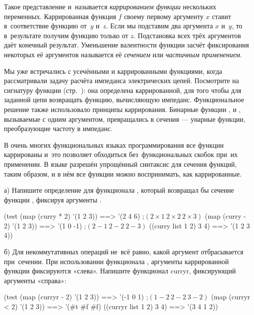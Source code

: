 Такое представление и~называется \emph{каррированием функции} нескольких переменных. Каррированная функция $f$ своему первому аргументу $x$ ставит в~соответствие функцию от~$y$ и~$z$. Если мы подставим два аргумента $x$ и~$y$, то в~результате получим функцию только от $z$. Подстановка всех трёх аргументов даёт конечный результат. Уменьшение валентности функции засчёт фиксирования некоторых её аргументов называется её \emph{сечением} или \emph{частичным применением}.

Мы уже встречались с усечёнными и каррированными функциями, когда рассматривали задачу расчёта импеданса электрических цепей. Посмотрите на сигнатуру функции  (стр.~\pageref{example:impedance}): она определена каррированной, для того чтобы для заданной цепи возвращать функцию, вычисляющую импеданс. Функциональное решение также использовало принципы каррирования. Бинарные функции ,  и , вызываемые с одним аргументом, превращались в сечения --- унарные функции, преобразующие частоту в импеданс.

\label{ML-notation}В очень многих функциональных языках программирования все функции каррированы и~это позволяет обходиться без~функциональных скобок при~их применении. В языке \Scheme разрешён упрощённый синтаксис для сечения функций, таким образом, и в нём все функции можно воспринимать, как каррированные.

\begin{Assignment}

  а) Напишите определение для функционала , который возвращал бы сечение функции , фиксируя аргументы . 

  \begin{Specification}
(test
  (map (curry * 2) '(1 2 3)) ==> '(2 4 6)  ;$(2\times1\ 2\times2\ 2\times3)$
  (map (curry - 2) '(1 2 3)) ==> '(1 0 -1) ;$(2-1\ 2-2\ 2-3)$
  ((curry list 1 2) 3 4)     ==> '(1 2 3 4))
  \end{Specification}

  б) Для некоммутативных операций не~всё равно, какой аргумент отбрасывается при~сечении. При использовании функционала , аргументы каррированной функции фиксируются «слева». Напишите функционал \si{curryr}, фиксирующий аргументы «справа»: 

  \begin{Specification}
(test 
  (map (curryr - 2) '(1 2 3)) ==> '(-1 0 1)   ;$(1-2\ 2-2\ 3-2)$   
  (map (curryr < 2) '(1 2 3)) ==> '(#t #f #f)
  ((curryr list 1 2) 3 4)     ==> '(3 4 1 2))  
  \end{Specification}
\end{Assignment}

